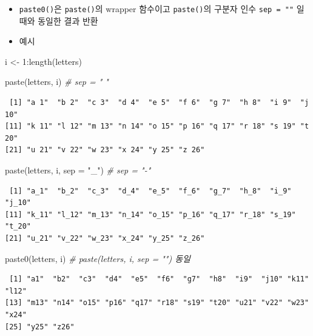 \documentclass[
  11pt,
]{krantz}
\newenvironment{Shaded}{\begin{snugshade}}{\end{snugshade}}
\newcommand{\AttributeTok}[1]{\textcolor[rgb]{0.61,0.61,0.61}{#1}}
\newcommand{\CommentTok}[1]{\textcolor[rgb]{0.37,0.37,0.37}{\textit{#1}}}
\newcommand{\DecValTok}[1]{\textcolor[rgb]{0.06,0.06,0.06}{#1}}
\newcommand{\FunctionTok}[1]{\textcolor[rgb]{0,0,0}{#1}}
\newcommand{\NormalTok}[1]{#1}
\newcommand{\OtherTok}[1]{\textcolor[rgb]{0.37,0.37,0.37}{#1}}
\newcommand{\SpecialCharTok}[1]{\textcolor[rgb]{0,0,0}{#1}}
\newcommand{\StringTok}[1]{\textcolor[rgb]{0.5,0.5,0.5}{#1}}
\providecommand{\tightlist}{%
  \setlength{\itemsep}{0pt}\setlength{\parskip}{0pt}}
\begin{document}
\normalsize

\begin{itemize}
\tightlist
\item
  \texttt{paste0()}은 \texttt{paste()}의 wrapper 함수이고 \texttt{paste()}의 구분자 인수 \texttt{sep\ =\ ""} 일 때와 동일한 결과 반환
\item
  예시
\end{itemize}

\footnotesize

\begin{Shaded}
\begin{Highlighting}[]
\NormalTok{i }\OtherTok{\textless{}{-}} \DecValTok{1}\SpecialCharTok{:}\FunctionTok{length}\NormalTok{(letters)}

\FunctionTok{paste}\NormalTok{(letters, i) }\CommentTok{\# sep = " "}
\end{Highlighting}
\end{Shaded}

\begin{verbatim}
 [1] "a 1"  "b 2"  "c 3"  "d 4"  "e 5"  "f 6"  "g 7"  "h 8"  "i 9"  "j 10"
[11] "k 11" "l 12" "m 13" "n 14" "o 15" "p 16" "q 17" "r 18" "s 19" "t 20"
[21] "u 21" "v 22" "w 23" "x 24" "y 25" "z 26"
\end{verbatim}

\begin{Shaded}
\begin{Highlighting}[]
\FunctionTok{paste}\NormalTok{(letters, i, }\AttributeTok{sep =} \StringTok{"\_"}\NormalTok{) }\CommentTok{\# sep = "{-}"}
\end{Highlighting}
\end{Shaded}

\begin{verbatim}
 [1] "a_1"  "b_2"  "c_3"  "d_4"  "e_5"  "f_6"  "g_7"  "h_8"  "i_9"  "j_10"
[11] "k_11" "l_12" "m_13" "n_14" "o_15" "p_16" "q_17" "r_18" "s_19" "t_20"
[21] "u_21" "v_22" "w_23" "x_24" "y_25" "z_26"
\end{verbatim}

\begin{Shaded}
\begin{Highlighting}[]
\FunctionTok{paste0}\NormalTok{(letters, i) }\CommentTok{\# paste(letters, i, sep = "") 동일}
\end{Highlighting}
\end{Shaded}

\begin{verbatim}
 [1] "a1"  "b2"  "c3"  "d4"  "e5"  "f6"  "g7"  "h8"  "i9"  "j10" "k11" "l12"
[13] "m13" "n14" "o15" "p16" "q17" "r18" "s19" "t20" "u21" "v22" "w23" "x24"
[25] "y25" "z26"
\end{verbatim}
\end{document}
